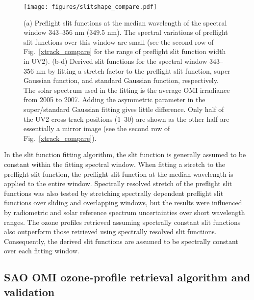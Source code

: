 \documentclass[amt,manuscript]{copernicus}
\begin{document}
\begin{figure}[t]
\texttt{[image: figures/slitshape\_compare.pdf]}
\caption{(a) Preflight slit functions at the median wavelength of the spectral window $343$--$356$ nm ($349.5$ nm). The spectral variations of preflight slit functions over this window are small (see the second row of Fig.~\ref{xtrack_compare} for the range of preflight slit function width in UV2). (b-d) Derived slit functions for the spectral window $343$--$356$ nm by fitting a stretch factor to the preflight slit function, super Gaussian function, and standard Gaussian function, respectively. The solar spectrum used in the fitting is the average OMI irradiance from 2005 to 2007. Adding the asymmetric parameter in the super/standard Gaussian fitting gives little difference. Only half of the UV2 cross track positions (1--30) are shown as the other half are essentially a mirror image (see the second row of Fig.~\ref{xtrack_compare}).}
\label{slit_shape}
\end{figure}

In the slit function fitting algorithm, the slit function is generally assumed to be constant within the fitting spectral window. When fitting a stretch to the preflight slit function, the preflight slit function at the median wavelength is applied to the entire window. Spectrally resolved stretch of the preflight slit functions was also tested by stretching spectrally dependent preflight slit functions over sliding and overlapping windows, but the results were influenced by radiometric and solar reference spectrum uncertainties over short wavelength ranges. The ozone profiles retrieved assuming spectrally constant slit functions also outperform those retrieved using spectrally resolved slit functions. Consequently, the derived slit functions are assumed to be spectrally constant over each fitting window.


\subsection{SAO OMI ozone-profile retrieval algorithm and validation}
\end{document}
